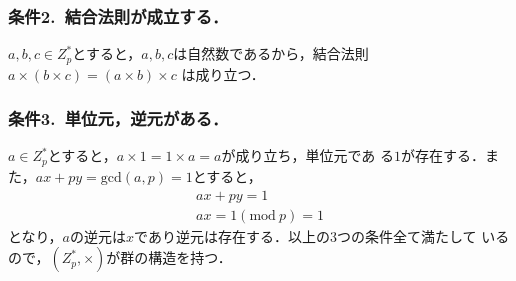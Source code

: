 \documentclass[a4paper,12pt]{jarticle}
\begin{document}
\subsubsection*{条件2.~結合法則が成立する．}
\vspace{-4mm}
$a,b,c\in Z_p^*$とすると，$a,b,c$は自然数であるから，結合法則
$a \times (b \times c)=(a \times b) \times c$
は成り立つ．
%
\vspace{-6mm}
\subsubsection*{条件3.~単位元，逆元がある．}
\vspace{-4mm}
$a\in Z_p^*$とすると，$a \times 1 = 1 \times a = a$が成り立ち，単位元であ
る$1$が存在する．また，$ax+py=\mathrm{gcd}(a,p)=1$とすると，
%
\begin{eqnarray}
 ax + py = 1\\
 ax = 1(\mathrm{mod}~p) = 1
\end{eqnarray}
%
となり，$a$の逆元は$x$であり逆元は存在する．以上の3つの条件全て満たして
いるので，$(Z_p^*,\times)$が群の構造を持つ．
\vspace{-5mm}
\end{document}
